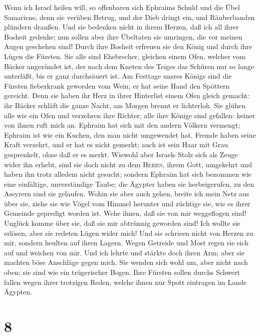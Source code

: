  Wenn ich Israel heilen will, so offenbaren sich Ephraims
Schuld und die Übel Samariens; denn sie verüben Betrug, und der Dieb
dringt ein, und Räuberbanden plündern draußen.  Und sie
bedenken nicht in ihrem Herzen, daß ich all ihrer Bosheit gedenke; nun
sollen aber ihre Übeltaten sie umringen, die vor meinen Augen geschehen
sind!  Durch ihre Bosheit erfreuen sie den König und durch
ihre Lügen die Fürsten.  Sie alle sind Ehebrecher,
gleichen einem Ofen, welcher vom Bäcker angezündet ist, der nach dem
Kneten des Teiges das Schüren nur so lange unterläßt, bis er ganz
durchsäuert ist.  Am Festtage unsres Königs sind die
Fürsten fieberkrank geworden vom Wein; er hat seine Hand den Spöttern
gereicht.  Denn sie haben ihr Herz in ihrer Hinterlist
einem Ofen gleich gemacht: ihr Bäcker schläft die ganze Nacht, am Morgen
brennt er lichterloh.  Sie glühen alle wie ein Ofen und
verzehren ihre Richter; alle ihre Könige sind gefallen: keiner von ihnen
ruft mich an.  Ephraim hat sich mit den andern Völkern
vermengt; Ephraim ist wie ein Kuchen, den man nicht umgewendet hat.
 Fremde haben seine Kraft verzehrt, und er hat es nicht
gemerkt; auch ist sein Haar mit Grau gesprenkelt, ohne daß er es merkt.
 Wiewohl aber Israels Stolz sich als Zeuge wider ihn
erhebt, sind sie doch nicht zu dem \textsc{Herrn}, ihrem Gott, umgekehrt
und haben ihn trotz alledem nicht gesucht;  sondern
Ephraim hat sich benommen wie eine einfältige, unverständige Taube; die
Ägypter haben sie herbeigerufen, zu den Assyrern sind sie gelaufen.
 Wohin sie aber auch gehen, breite ich mein Netz aus über
sie, ziehe sie wie Vögel vom Himmel herunter und züchtige sie, wie es
ihrer Gemeinde gepredigt worden ist.  Wehe ihnen, daß sie
von mir weggeflogen sind! Unglück komme über sie, daß sie mir abtrünnig
geworden sind! Ich wollte sie erlösen, aber sie redeten Lügen wider
mich!  Und sie schrieen nicht von Herzen zu mir, sondern
heulten auf ihren Lagern. Wegen Getreide und Most regen sie sich auf und
weichen von mir.  Und ich lehrte und stärkte doch ihren
Arm; aber sie machten böse Anschläge gegen mich.  Sie
wenden sich wohl um, aber nicht nach oben; sie sind wie ein trügerischer
Bogen. Ihre Fürsten sollen durchs Schwert fallen wegen ihrer trotzigen
Reden, welche ihnen nur Spott eintragen im Lande Ägypten.

\hypertarget{section-7}{%
\section{8}\label{section-7}}

